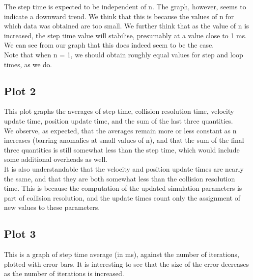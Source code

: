 \documentclass[11pt]{article}
\begin{document}
	The step time is expected to be independent of n. The graph, however, seems to indicate a downward trend. We think that this is because the values of n for which data was obtained are too small. We further think that as the value of n is increased, the step time value will stabilise, presumably at a value close to 1 ms. We can see from our graph that this does indeed seem to be the case.\\

	Note that when n = 1, we should obtain roughly equal values for step and loop times, as we do.

\subsection{Plot 2}


	This plot graphs the averages of step time, collision resolution time, velocity update time, position update time, and the sum of the last three quantities.\\

	We observe, as expected, that the averages remain more or less constant as n increases (barring anomalies at small values of n), and that the sum of the final three quantities is still somewhat less than the step time, which would include some additional overheads as well.\\

	It is also understandable that the velocity and position update times are nearly the same, and that they are both somewhat less than the collision resolution time. This is because the computation of the updated simulation parameters is part of collision resolution, and the update times count only the assignment of new values to these parameters.

\subsection{Plot 3}


	This is a graph of step time average (in ms), against the number of iterations, plotted with error bars. It is interesting to see that the size of the error decreases as the number of iterations is increased.
\end{document}
